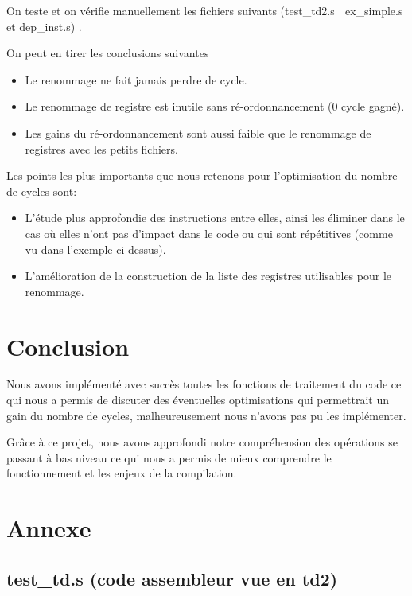\documentclass[11pt, openany]{article}
\begin{document}
On teste et on vérifie manuellement les fichiers suivants (test\_td2.s | ex\_simple.s et dep\_inst.s) .

On peut en tirer les conclusions suivantes

\begin{itemize}
    \item Le renommage ne fait jamais perdre de cycle.
    \item Le renommage de registre est inutile sans ré-ordonnancement (0 cycle gagné).
    \item Les gains du ré-ordonnancement sont aussi faible que le renommage de registres avec les petits fichiers.
\end{itemize}

Les points les plus importants que nous retenons pour l'optimisation du nombre de cycles sont:
\begin{itemize}
    \item L'étude plus approfondie des instructions entre elles, ainsi les éliminer dans le cas où elles n'ont pas d'impact dans le code ou  qui sont répétitives (comme vu dans l'exemple ci-dessus).
    \item L'amélioration de la construction de la liste des registres utilisables pour le renommage.
\end{itemize}

\section{Conclusion}


Nous avons implémenté avec succès toutes les fonctions de traitement du code ce qui nous a permis de discuter des éventuelles optimisations qui permettrait un gain du nombre de cycles, malheureusement nous n'avons pas pu les implémenter.

Grâce à ce projet, nous avons approfondi notre compréhension des opérations se passant à bas niveau ce qui nous a permis de mieux comprendre le fonctionnement et les enjeux de la compilation.

\newpage
\appendix
\section{Annexe}
\subsection{test\_td.s (code assembleur vue en td2)}
\label{chap:TestTd2}
\end{document}
